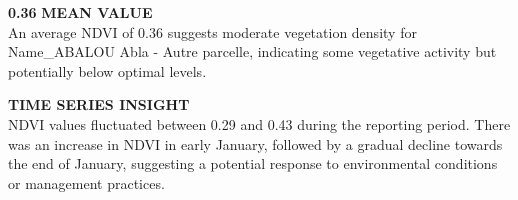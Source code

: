 \documentclass[12pt,a4paper]{article}
\begin{document}
\parbox{\textwidth}{ %
    \begin{minipage}[t]{0.48\textwidth}
        \vspace{0.3cm}
        \textbf{\Large{0.36}}
        \vspace{0.3cm}
        \textbf{MEAN VALUE}\\
        An average NDVI of 0.36 suggests moderate vegetation density for Name\_ABALOU Abla - Autre parcelle, indicating some vegetative activity but potentially below optimal levels.
        \vspace{0.5cm}

        \textbf{TIME SERIES INSIGHT}\\
        NDVI values fluctuated between 0.29 and 0.43 during the reporting period. There was an increase in NDVI in early January, followed by a gradual decline towards the end of January, suggesting a potential response to environmental conditions or management practices.
    \end{minipage}\hfill
    \begin{minipage}[t]{0.48\textwidth}
        \begin{center}
\end{center}
\end{minipage}}
\end{document}
